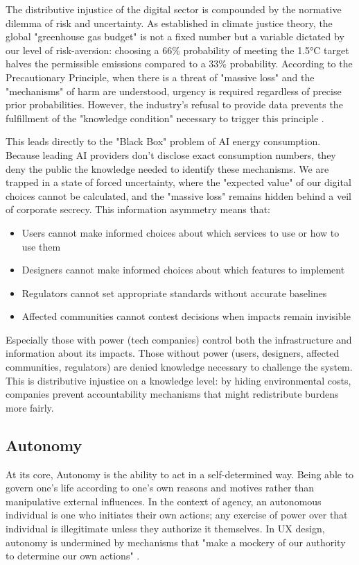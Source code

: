 \par The distributive injustice of the digital sector is compounded by the normative dilemma of risk and uncertainty. As established in climate justice theory, the global "greenhouse gas budget" is not a fixed number but a variable dictated by our level of risk-aversion: choosing a 66\% probability of meeting the 1.5°C target halves the permissible emissions compared to a 33\% probability. According to the Precautionary Principle, when there is a threat of "massive loss" and the "mechanisms" of harm are understood, urgency is required regardless of precise prior probabilities. However, the industry’s refusal to provide data prevents the fulfillment of the "knowledge condition" necessary to trigger this principle \cite{sep-justice-climate}.

\par This leads directly to the "Black Box" problem of AI energy consumption. Because leading AI providers don’t disclose exact consumption numbers, they deny the public the knowledge needed to identify these mechanisms. We are trapped in a state of forced uncertainty, where the "expected value" of our digital choices cannot be calculated, and the "massive loss" remains hidden behind a veil of corporate secrecy. This information asymmetry means that:
\begin{itemize}
\item Users cannot make informed choices about which services to use or how to use them
\item Designers cannot make informed choices about which features to implement
\item Regulators cannot set appropriate standards without accurate baselines
\item Affected communities cannot contest decisions when impacts remain invisible
\end{itemize}
Especially those with power (tech companies) control both the infrastructure and information about its impacts. Those without power (users, designers, affected communities, regulators) are denied knowledge necessary to challenge the system. This is distributive injustice on a knowledge level: by hiding environmental costs, companies prevent accountability mechanisms that might redistribute burdens more fairly.

\subsection{Autonomy}
At its core, Autonomy is the ability to act in a self-determined way. Being able to govern one's life according to one's own reasons and motives rather than manipulative external influences. In the context of agency, an autonomous individual is one who initiates their own actions; any exercise of power over that individual is illegitimate unless they authorize it themselves.
In UX design, autonomy is undermined by mechanisms that "make a mockery of our authority to determine our own actions" \cite{sep-personal-autonomy}.

